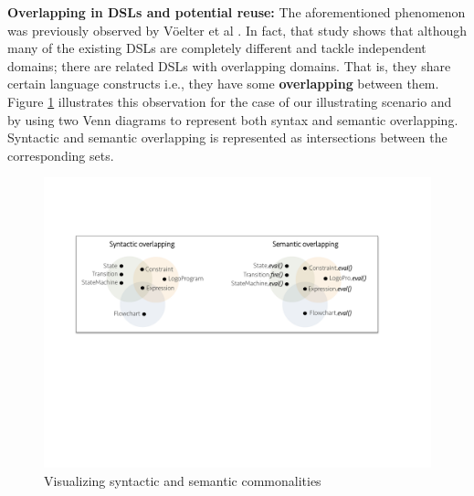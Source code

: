 
\textbf{Overlapping in DSLs and potential reuse:} The aforementioned phenomenon was previously observed by V\"oelter et al \cite[p. 60-61]{voelter:2013}. In fact, that study shows that although many of the existing DSLs are completely different and tackle independent domains; there are related DSLs with overlapping domains. That is, they share certain language constructs i.e., they have some \textbf{overlapping} between them. Figure \ref{fig:shape} illustrates this observation for the case of our illustrating scenario and by using two Venn diagrams to represent both syntax and semantic overlapping. Syntactic and semantic overlapping is represented as intersections between the corresponding sets. 

\begin{figure}
\centering
\includegraphics[width=1\linewidth]{images/domains-inaction.pdf}
\caption{Visualizing syntactic and semantic commonalities}
\label{fig:shape}
\end{figure}

